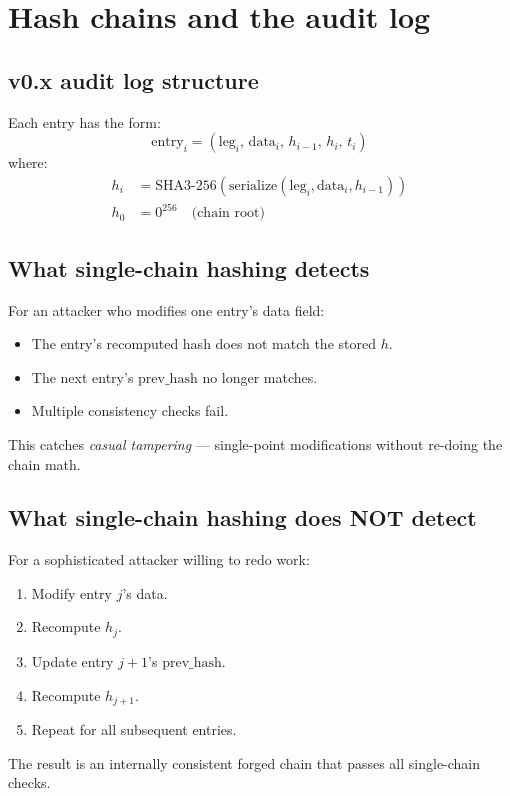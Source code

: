 \documentclass[11pt,a4paper]{article}
\theoremstyle{plain}
\theoremstyle{definition}
\theoremstyle{remark}
\begin{document}
\section{Hash chains and the audit log}

\subsection{v0.x audit log structure}

Each entry has the form:
\begin{equation}
\text{entry}_i = (\text{leg}_i,\, \text{data}_i,\, h_{i-1},\, h_i,\, t_i)
\end{equation}
where:
\begin{align}
h_i &= \mathrm{SHA3\text{-}256}\!\left(\mathrm{serialize}(\text{leg}_i, \text{data}_i, h_{i-1})\right) \\
h_0 &= 0^{256} \quad \text{(chain root)}
\end{align}

\subsection{What single-chain hashing detects}

For an attacker who modifies one entry's data field:
\begin{itemize}[itemsep=2pt,topsep=2pt]
  \item The entry's recomputed hash does not match the stored $h$.
  \item The next entry's $\text{prev\_hash}$ no longer matches.
  \item Multiple consistency checks fail.
\end{itemize}
This catches \emph{casual tampering} --- single-point modifications without re-doing the chain math.

\subsection{What single-chain hashing does NOT detect}

For a sophisticated attacker willing to redo work:
\begin{enumerate}[itemsep=2pt,topsep=2pt]
  \item Modify entry $j$'s data.
  \item Recompute $h_j$.
  \item Update entry $j+1$'s $\text{prev\_hash}$.
  \item Recompute $h_{j+1}$.
  \item Repeat for all subsequent entries.
\end{enumerate}
The result is an internally consistent forged chain that passes all single-chain checks.
\end{document}
